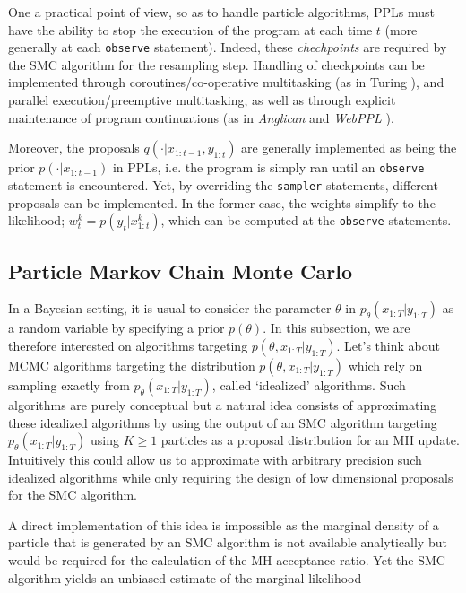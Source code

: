 One a practical point of view, so as to handle particle algorithms, \glspl{PPL} must have the ability to stop the execution of the program at each time $t$ (more generally at each \texttt{observe} statement). Indeed, these \textit{chechpoints} are required by the \gls{SMC} algorithm for the resampling step.
Handling of checkpoints can be implemented through coroutines/co-operative multitasking (as in Turing \cite{Turing}), and parallel execution/preemptive multitasking, as well as through explicit maintenance of program continuations (as in \emph{Anglican} \cite{wood-aistats-2014} and \emph{WebPPL} \cite{dippl}).

Moreover, the proposals $q(\cdot|x_{1:t-1},y_{1:t})$ are generally implemented as being the prior $p(\cdot|x_{1:t-1})$ in \glspl{PPL}, i.e. the program is simply ran until an \texttt{observe} statement is encountered. Yet, by overriding the \texttt{sampler} statements, different proposals can be implemented. In the former case, the weights simplify to the likelihood; $w_{t}^k = p(y_{t}|x^k_{1:t})$, which can be computed at the \texttt{observe} statements. 

\subsection{Particle Markov Chain Monte Carlo} \label{PMCMC}
In a Bayesian setting, it is usual to consider the parameter $\theta$ in $p_\theta(x_{1:T}|y_{1:T})$ as a random variable by specifying a prior $p(\theta)$. In this subsection, we are therefore interested on algorithms targeting
$p(\theta, x_{1:T}|y_{1:T})$.
Let's think about \gls{MCMC} algorithms targeting the distribution $p(\theta, x_{1:T}|y_{1:T})$ which rely on sampling exactly from $p_\theta(x_{1:T}|y_{1:T})$, called ‘idealized’ algorithms.
Such algorithms are purely conceptual but a natural idea consists of approximating these idealized algorithms by using the output of an \gls{SMC} algorithm targeting $p_\theta(x_{1:T}|y_{1:T})$ using $K \ge 1$ particles as a proposal distribution for an \gls{MH} update.
Intuitively this could allow us to approximate with arbitrary precision such idealized algorithms while only requiring the design of low dimensional proposals for the \gls{SMC} algorithm.

A direct implementation of this idea is impossible as the marginal density of a particle that is generated by an \gls{SMC} algorithm is not available analytically but would be required for the calculation of the \gls{MH} acceptance ratio. Yet the \gls{SMC} algorithm yields an unbiased estimate of the marginal likelihood

